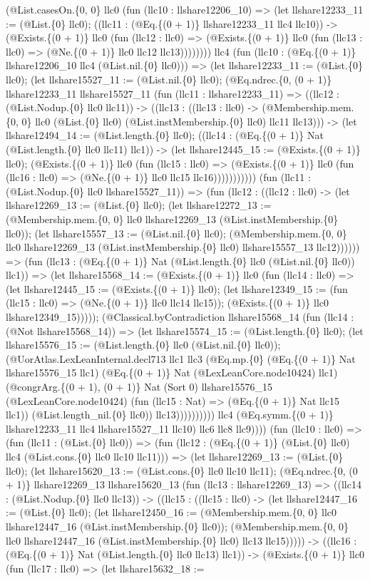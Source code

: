 \documentclass[11pt]{article}
\begin{document}
(@List.casesOn.\{0, 0\} llc0 (fun (llc10 : llshare12206\_10) => (let llshare12233\_11 := (@List.\{0\} llc0); ((llc11 : (@Eq.\{(0 + 1)\} llshare12233\_11 llc4 llc10)) -> (@Exists.\{(0 + 1)\} llc0 (fun (llc12 : llc0) => (@Exists.\{(0 + 1)\} llc0 (fun (llc13 : llc0) => (@Ne.\{(0 + 1)\} llc0 llc12 llc13)))))))) llc4 (fun (llc10 : (@Eq.\{(0 + 1)\} llshare12206\_10 llc4 (@List.nil.\{0\} llc0))) => (let llshare12233\_11 := (@List.\{0\} llc0); (let llshare15527\_11 := (@List.nil.\{0\} llc0); (@Eq.ndrec.\{0, (0 + 1)\} llshare12233\_11 llshare15527\_11 (fun (llc11 : llshare12233\_11) => ((llc12 : (@List.Nodup.\{0\} llc0 llc11)) -> ((llc13 : ((llc13 : llc0) -> (@Membership.mem.\{0, 0\} llc0 (@List.\{0\} llc0) (@List.instMembership.\{0\} llc0) llc11 llc13))) -> (let llshare12494\_14 := (@List.length.\{0\} llc0); ((llc14 : (@Eq.\{(0 + 1)\} Nat (@List.length.\{0\} llc0 llc11) llc1)) -> (let llshare12445\_15 := (@Exists.\{(0 + 1)\} llc0); (@Exists.\{(0 + 1)\} llc0 (fun (llc15 : llc0) => (@Exists.\{(0 + 1)\} llc0 (fun (llc16 : llc0) => (@Ne.\{(0 + 1)\} llc0 llc15 llc16))))))))))) (fun (llc11 : (@List.Nodup.\{0\} llc0 llshare15527\_11)) => (fun (llc12 : ((llc12 : llc0) -> (let llshare12269\_13 := (@List.\{0\} llc0); (let llshare12272\_13 := (@Membership.mem.\{0, 0\} llc0 llshare12269\_13 (@List.instMembership.\{0\} llc0)); (let llshare15557\_13 := (@List.nil.\{0\} llc0); (@Membership.mem.\{0, 0\} llc0 llshare12269\_13 (@List.instMembership.\{0\} llc0) llshare15557\_13 llc12)))))) => (fun (llc13 : (@Eq.\{(0 + 1)\} Nat (@List.length.\{0\} llc0 (@List.nil.\{0\} llc0)) llc1)) => (let llshare15568\_14 := (@Exists.\{(0 + 1)\} llc0 (fun (llc14 : llc0) => (let llshare12445\_15 := (@Exists.\{(0 + 1)\} llc0); (let llshare12349\_15 := (fun (llc15 : llc0) => (@Ne.\{(0 + 1)\} llc0 llc14 llc15)); (@Exists.\{(0 + 1)\} llc0 llshare12349\_15))))); (@Classical.byContradiction llshare15568\_14 (fun (llc14 : (@Not llshare15568\_14)) => (let llshare15574\_15 := (@List.length.\{0\} llc0); (let llshare15576\_15 := (@List.length.\{0\} llc0 (@List.nil.\{0\} llc0)); (@UorAtlas.LexLeanInternal.decl713 llc1 llc3 (@Eq.mp.\{0\} (@Eq.\{(0 + 1)\} Nat llshare15576\_15 llc1) (@Eq.\{(0 + 1)\} Nat (@LexLeanCore.node10424) llc1) (@congrArg.\{(0 + 1), (0 + 1)\} Nat (Sort 0) llshare15576\_15 (@LexLeanCore.node10424) (fun (llc15 : Nat) => (@Eq.\{(0 + 1)\} Nat llc15 llc1)) (@List.length\_nil.\{0\} llc0)) llc13)))))))))) llc4 (@Eq.symm.\{(0 + 1)\} llshare12233\_11 llc4 llshare15527\_11 llc10) llc6 llc8 llc9)))) (fun (llc10 : llc0) => (fun (llc11 : (@List.\{0\} llc0)) => (fun (llc12 : (@Eq.\{(0 + 1)\} (@List.\{0\} llc0) llc4 (@List.cons.\{0\} llc0 llc10 llc11))) => (let llshare12269\_13 := (@List.\{0\} llc0); (let llshare15620\_13 := (@List.cons.\{0\} llc0 llc10 llc11); (@Eq.ndrec.\{0, (0 + 1)\} llshare12269\_13 llshare15620\_13 (fun (llc13 : llshare12269\_13) => ((llc14 : (@List.Nodup.\{0\} llc0 llc13)) -> ((llc15 : ((llc15 : llc0) -> (let llshare12447\_16 := (@List.\{0\} llc0); (let llshare12450\_16 := (@Membership.mem.\{0, 0\} llc0 llshare12447\_16 (@List.instMembership.\{0\} llc0)); (@Membership.mem.\{0, 0\} llc0 llshare12447\_16 (@List.instMembership.\{0\} llc0) llc13 llc15))))) -> ((llc16 : (@Eq.\{(0 + 1)\} Nat (@List.length.\{0\} llc0 llc13) llc1)) -> (@Exists.\{(0 + 1)\} llc0 (fun (llc17 : llc0) => (let llshare15632\_18 := 
\end{document}
